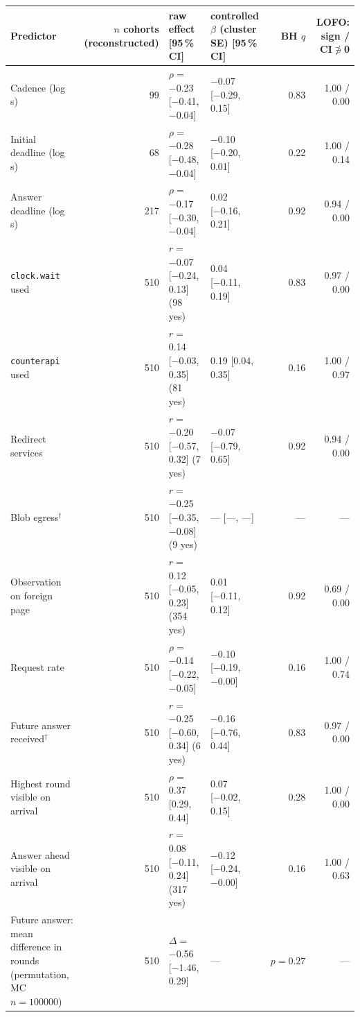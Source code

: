 \begin{tabular}{lrllrr}
\toprule
Predictor & $n$ cohorts (reconstructed) & raw effect [95\,\% CI] & controlled $\beta$ (cluster SE) [95\,\% CI] & BH $q$ & LOFO: sign / CI$\not\ni$0 \\
\midrule
Cadence (log s) & 99 & $\rho=$\num{-0.23} [\num{-0.41}, \num{-0.04}] & \num{-0.07} [\num{-0.29}, \num{0.15}] & 0.83 & 1.00 / 0.00 \\
Initial deadline (log s) & 68 & $\rho=$\num{-0.28} [\num{-0.48}, \num{-0.04}] & \num{-0.10} [\num{-0.20}, \num{0.01}] & 0.22 & 1.00 / 0.14 \\
Answer deadline (log s) & 217 & $\rho=$\num{-0.17} [\num{-0.30}, \num{-0.04}] & \num{0.02} [\num{-0.16}, \num{0.21}] & 0.92 & 0.94 / 0.00 \\
\texttt{clock.wait} used & 510 & $r=$\num{-0.07} [\num{-0.24}, \num{0.13}] (98 yes) & \num{0.04} [\num{-0.11}, \num{0.19}] & 0.83 & 0.97 / 0.00 \\
\texttt{counterapi} used & 510 & $r=$\num{0.14} [\num{-0.03}, \num{0.35}] (81 yes) & \num{0.19} [\num{0.04}, \num{0.35}] & 0.16 & 1.00 / 0.97 \\
Redirect services & 510 & $r=$\num{-0.20} [\num{-0.57}, \num{0.32}] (7 yes) & \num{-0.07} [\num{-0.79}, \num{0.65}] & 0.92 & 0.94 / 0.00 \\
Blob egress$^\dagger$ & 510 & $r=$\num{-0.25} [\num{-0.35}, \num{-0.08}] (9 yes) & --- [---, ---] & --- & --- \\
Observation on foreign page & 510 & $r=$\num{0.12} [\num{-0.05}, \num{0.23}] (354 yes) & \num{0.01} [\num{-0.11}, \num{0.12}] & 0.92 & 0.69 / 0.00 \\
Request rate & 510 & $\rho=$\num{-0.14} [\num{-0.22}, \num{-0.05}] & \num{-0.10} [\num{-0.19}, \num{-0.00}] & 0.16 & 1.00 / 0.74 \\
Future answer received$^\dagger$ & 510 & $r=$\num{-0.25} [\num{-0.60}, \num{0.34}] (6 yes) & \num{-0.16} [\num{-0.76}, \num{0.44}] & 0.83 & 0.97 / 0.00 \\
Highest round visible on arrival & 510 & $\rho=$\num{0.37} [\num{0.29}, \num{0.44}] & \num{0.07} [\num{-0.02}, \num{0.15}] & 0.28 & 1.00 / 0.00 \\
Answer ahead visible on arrival & 510 & $r=$\num{0.08} [\num{-0.11}, \num{0.24}] (317 yes) & \num{-0.12} [\num{-0.24}, \num{-0.00}] & 0.16 & 1.00 / 0.63 \\
\midrule
Future answer: mean difference in rounds (permutation, MC $n=100000$) & 510 & $\Delta=$\num{-0.56} [\num{-1.46}, \num{0.29}] & --- & $p=0.27$ & --- \\
\bottomrule
\end{tabular}
